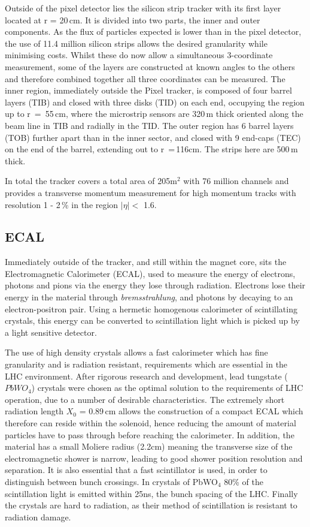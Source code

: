 Outside of the pixel detector lies the silicon strip tracker with its first layer located at r = 20\,cm. It is divided into two parts, the inner and outer components. As the flux of particles expected is lower than in the pixel detector, the use of 11.4 million silicon strips allows the desired granularity while minimising costs. Whilst these do now allow a simultaneous 3-coordinate measurement, some of the layers are constructed at known angles to the others and therefore combined together all three coordinates can be measured. The inner region, immediately outside the Pixel tracker, is composed of four barrel layers (TIB) and closed with three disks (TID) on each end, occupying the region up to r~=~55\,cm, where the microstrip sensors are 320\,\textmu m thick oriented along the beam line in TIB and radially in the TID. The outer region has 6 barrel layers (TOB) further apart than in the inner sector, and closed with 9 end-caps (TEC) on the end of the barrel, extending out to r~=\,116cm. The strips here are 500\,\textmu m thick.

In total the tracker covers a total area of 205m$^{2}$ with 76 million channels and provides a transverse momentum measurement for high momentum tracks with resolution 1 - 2\,\% in the region $|\eta| <$ 1.6.



\subsection{ECAL}

Immediately outside of the tracker, and still within the magnet core, sits the Electromagnetic Calorimeter (ECAL), used to measure the energy of electrons, photons and pions via the energy they lose through radiation. Electrons lose their energy in the material through \textit{bremsstrahlung}, and photons by decaying to an electron-positron pair. Using a hermetic homogenous calorimeter of scintillating crystals, this energy can be converted to scintillation light which is picked up by a light sensitive detector. 

The use of high density crystals allows a fast calorimeter which has fine granularity and is radiation resistant, requirements which are essential in the LHC environment. After rigorous research and development, lead tungstate ($PbWO_{4}$) crystals were chosen as the optimal solution to the requirements of LHC operation, due to a number of desirable characteristics. The extremely short radiation length $X_{0}$ = 0.89\,cm allows the construction of a compact ECAL which therefore can reside within the solenoid, hence reducing the amount of material particles have to pass through before reaching the calorimeter. In addition, the material has a small Moliere radius (2.2cm) meaning the transverse size of the electromagnetic shower is narrow, leading to good shower position resolution and separation. It is also essential that a fast scintillator is used, in order to distinguish between bunch crossings. In crystals of PbWO$_{4}$ 80\% of the scintillation light is emitted within 25ns, the bunch spacing of the LHC. Finally the crystals are hard to radiation, as their method of scintillation is resistant to radiation damage. 

